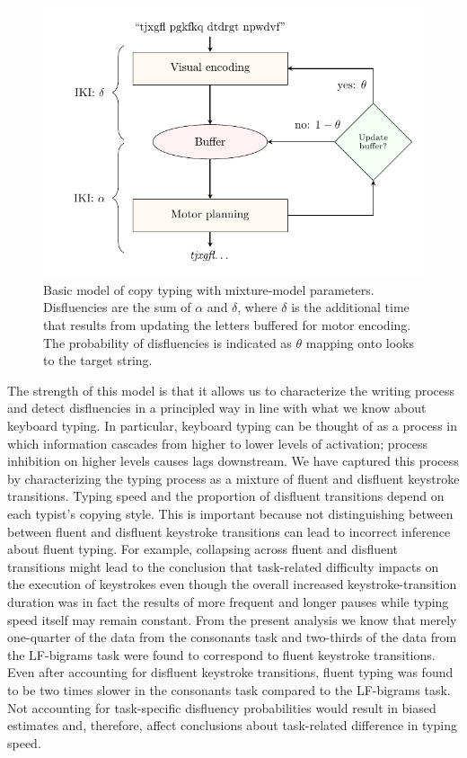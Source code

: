\documentclass[
  english,
  man,mask,floatsintext]{apa7}
\begin{document}
\begin{figure}[bp!]

{\centering \includegraphics{spelling_decision_probs} 

}

\caption{Basic model of copy typing with mixture-model parameters. Disfluencies are the sum of $\alpha$ and $\delta$, where $\delta$ is the additional time that results from updating the letters buffered for motor encoding. The probability of disfluencies is indicated as $\theta$ mapping onto looks to the target string.}\label{fig:modelv2}
\end{figure}

The strength of this model is that it allows us to characterize the writing process and detect disfluencies in a principled way in line with what we know about keyboard typing. In particular, keyboard typing can be thought of as a process in which information cascades from higher to lower levels of activation; process inhibition on higher levels causes lags downstream. We have captured this process by characterizing the typing process as a mixture of fluent and disfluent keystroke transitions. Typing speed and the proportion of disfluent transitions depend on each typist's copying style. This is important because not distinguishing between between fluent and disfluent keystroke transitions can lead to incorrect inference about fluent typing. For example, collapsing across fluent and disfluent transitions might lead to the conclusion that task-related difficulty impacts on the execution of keystrokes even though the overall increased keystroke-transition duration was in fact the results of more frequent and longer pauses while typing speed itself may remain constant. From the present analysis we know that merely one-quarter of the data from the consonants task and two-thirds of the data from the LF-bigrams task were found to correspond to fluent keystroke transitions. Even after accounting for disfluent keystroke transitions, fluent typing was found to be two times slower in the consonants task compared to the LF-bigrams task. Not accounting for task-specific disfluency probabilities would result in biased estimates and, therefore, affect conclusions about task-related difference in typing speed.
\end{document}
